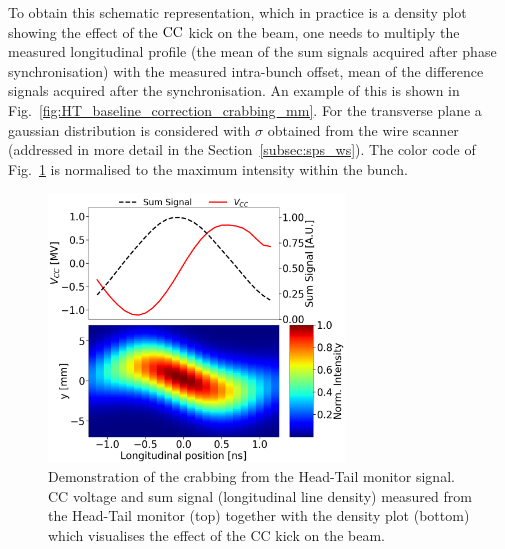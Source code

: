 To obtain this schematic representation, which in practice is a density plot showing the effect of the ${\mathrm{CC}}$ kick on the beam, one needs to multiply the measured longitudinal profile (the mean of the sum signals acquired after phase synchronisation) with the measured intra-bunch offset, mean of the difference signals acquired after the synchronisation. An example of this is shown in Fig.~\ref{fig:HT_baseline_correction_crabbing_mm}. For the transverse plane a gaussian distribution is considered with $\sigma$ obtained from the wire scanner (addressed in more detail in the Section~\ref{subsec:sps_ws}). The color code of Fig.~\ref{fig:crabbing_reconstruction_HT_monitor} is normalised to the maximum intensity within the bunch.

\begin{figure}[!h]
   \centering         
   \includegraphics[width=0.7\textwidth]{images/Ch4/HT_crabVoltage__20180530_135105_crabbing_only_CC_post_processing.png}
       \caption{Demonstration of the crabbing from the Head-Tail monitor signal. CC voltage and sum signal (longitudinal line density) measured from the Head-Tail monitor (top) together with the density plot (bottom) which visualises the effect of the CC kick on the beam.}
       \label{fig:crabbing_reconstruction_HT_monitor}
\end{figure}
   
